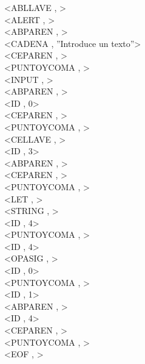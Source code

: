 \documentclass{article}
\begin{document}
\begin{flushleft}
<ABLLAVE , >\\
<ALERT , >\\
<ABPAREN , >\\
<CADENA , ''Introduce un texto''>\\
<CEPAREN , >\\
<PUNTOYCOMA , >\\
<INPUT , >\\
<ABPAREN , >\\
<ID , 0>\\
<CEPAREN , >\\
<PUNTOYCOMA , >\\
<CELLAVE , >\\
<ID , 3>\\
<ABPAREN , >\\
<CEPAREN , >\\
<PUNTOYCOMA , >\\
<LET , >\\
<STRING , >\\
<ID , 4>\\
<PUNTOYCOMA , >\\
<ID , 4>\\
<OPASIG , >\\
<ID , 0>\\
<PUNTOYCOMA , >\\
<ID , 1>\\
<ABPAREN , >\\
<ID , 4>\\
<CEPAREN , >\\
<PUNTOYCOMA , >\\
<EOF , >\\
\end{flushleft}
\clearpage
\end{document}
